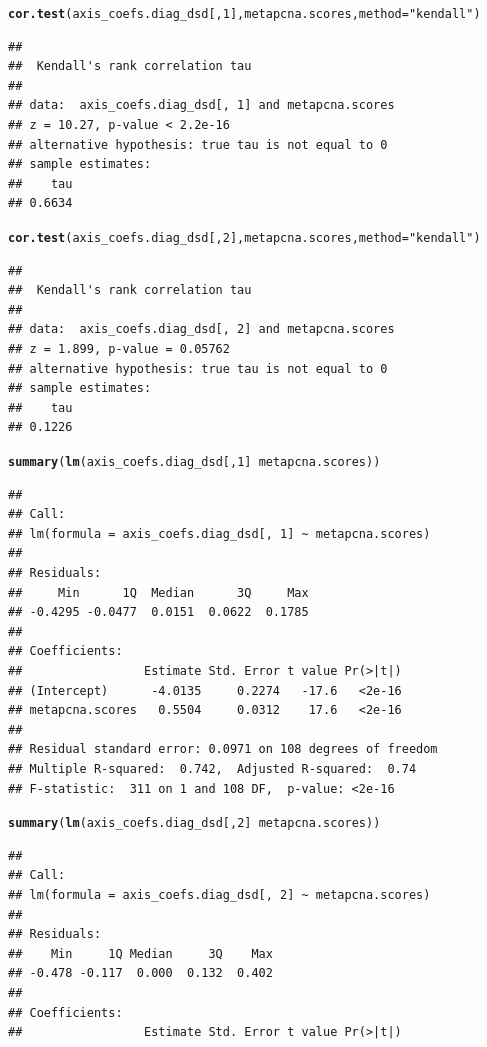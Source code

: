 \documentclass{article}\usepackage[]{graphicx}\usepackage[]{color}
\makeatletter
\newcommand{\hlnum}[1]{\textcolor[rgb]{0.686,0.059,0.569}{#1}}%
\newcommand{\hlstr}[1]{\textcolor[rgb]{0.192,0.494,0.8}{#1}}%
\newcommand{\hlopt}[1]{\textcolor[rgb]{0,0,0}{#1}}%
\newcommand{\hlstd}[1]{\textcolor[rgb]{0.345,0.345,0.345}{#1}}%
\newcommand{\hlkwc}[1]{\textcolor[rgb]{0.333,0.667,0.333}{#1}}%
\newcommand{\hlkwd}[1]{\textcolor[rgb]{0.737,0.353,0.396}{\textbf{#1}}}%
\newenvironment{kframe}{%
 \def\at@end@of@kframe{}%
 \ifinner\ifhmode%
  \def\at@end@of@kframe{\end{minipage}}%
  \begin{minipage}{\columnwidth}%
 \fi\fi%
 \def\FrameCommand##1{\hskip\@totalleftmargin \hskip-\fboxsep
 \colorbox{shadecolor}{##1}\hskip-\fboxsep
     \hskip-\linewidth \hskip-\@totalleftmargin \hskip\columnwidth}%
 \MakeFramed {\advance\hsize-\width
   \@totalleftmargin\z@ \linewidth\hsize
   \@setminipage}}%
 {\par\unskip\endMakeFramed%
 \at@end@of@kframe}
\newenvironment{knitrout}{}{} %
\makeatother
\begin{document}
\begin{knitrout}
\begin{kframe}\begin{alltt}
\hlkwd{cor.test}\hlstd{(axis_coefs.diag_dsd[,}\hlnum{1}\hlstd{], metapcna.scores,} \hlkwc{method} \hlstd{=} \hlstr{"kendall"}\hlstd{)}
\end{alltt}
\begin{verbatim}
## 
## 	Kendall's rank correlation tau
## 
## data:  axis_coefs.diag_dsd[, 1] and metapcna.scores
## z = 10.27, p-value < 2.2e-16
## alternative hypothesis: true tau is not equal to 0
## sample estimates:
##    tau 
## 0.6634
\end{verbatim}
\begin{alltt}
\hlkwd{cor.test}\hlstd{(axis_coefs.diag_dsd[,}\hlnum{2}\hlstd{], metapcna.scores,} \hlkwc{method} \hlstd{=} \hlstr{"kendall"}\hlstd{)}
\end{alltt}
\begin{verbatim}
## 
## 	Kendall's rank correlation tau
## 
## data:  axis_coefs.diag_dsd[, 2] and metapcna.scores
## z = 1.899, p-value = 0.05762
## alternative hypothesis: true tau is not equal to 0
## sample estimates:
##    tau 
## 0.1226
\end{verbatim}
\begin{alltt}
\hlkwd{summary}\hlstd{(}\hlkwd{lm}\hlstd{(axis_coefs.diag_dsd[,}\hlnum{1}\hlstd{]} \hlopt{~} \hlstd{metapcna.scores))}
\end{alltt}
\begin{verbatim}
## 
## Call:
## lm(formula = axis_coefs.diag_dsd[, 1] ~ metapcna.scores)
## 
## Residuals:
##     Min      1Q  Median      3Q     Max 
## -0.4295 -0.0477  0.0151  0.0622  0.1785 
## 
## Coefficients:
##                 Estimate Std. Error t value Pr(>|t|)
## (Intercept)      -4.0135     0.2274   -17.6   <2e-16
## metapcna.scores   0.5504     0.0312    17.6   <2e-16
## 
## Residual standard error: 0.0971 on 108 degrees of freedom
## Multiple R-squared:  0.742,	Adjusted R-squared:  0.74 
## F-statistic:  311 on 1 and 108 DF,  p-value: <2e-16
\end{verbatim}
\begin{alltt}
\hlkwd{summary}\hlstd{(}\hlkwd{lm}\hlstd{(axis_coefs.diag_dsd[,}\hlnum{2}\hlstd{]} \hlopt{~} \hlstd{metapcna.scores))}
\end{alltt}
\begin{verbatim}
## 
## Call:
## lm(formula = axis_coefs.diag_dsd[, 2] ~ metapcna.scores)
## 
## Residuals:
##    Min     1Q Median     3Q    Max 
## -0.478 -0.117  0.000  0.132  0.402 
## 
## Coefficients:
##                 Estimate Std. Error t value Pr(>|t|)

\end{verbatim}
\end{kframe}
\end{knitrout}
\end{document}

